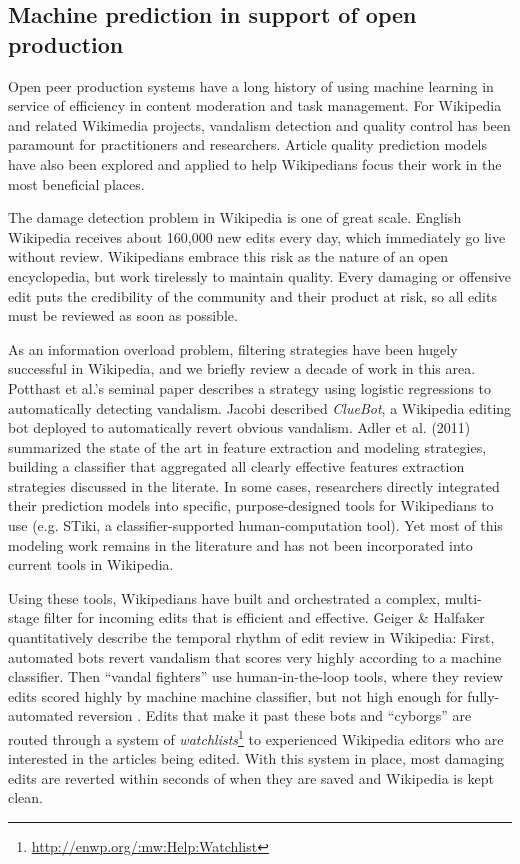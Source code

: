 \subsection{Machine prediction in support of open production}
Open peer production systems have a long history of using machine learning in service of efficiency in content moderation and task management. For Wikipedia and related Wikimedia projects, vandalism detection and quality control has been paramount for practitioners and researchers.  Article quality prediction models have also been explored and applied to help Wikipedians focus their work in the most beneficial places.

 The damage detection problem in Wikipedia is one of great scale.  English Wikipedia receives about 160,000 new edits every day, which immediately go live without review.  Wikipedians embrace this risk as the nature of an open encyclopedia, but work tirelessly to maintain quality. Every damaging or offensive edit puts the credibility of the community and their product at risk, so all edits must be reviewed as soon as possible.

As an information overload problem, filtering strategies have been hugely successful in Wikipedia, and we briefly review a decade of work in this area. Potthast et al.'s seminal paper\cite{potthast2008automatic} describes a strategy using logistic regressions to automatically detecting vandalism. Jacobi described \emph{ClueBot}\cite{carter2008cluebot}, a Wikipedia editing bot deployed to automatically revert obvious vandalism. Adler et al. (2011) summarized the state of the art in feature extraction and modeling strategies, building a classifier that aggregated all clearly effective features extraction strategies discussed in the literate\cite{adler2011wikipedia}.  In some cases, researchers directly integrated their prediction models into specific, purpose-designed tools for Wikipedians to use (e.g. STiki\cite{west2010stiki}, a classifier-supported human-computation tool). Yet most of this modeling work remains in the literature and has not been incorporated into current tools in Wikipedia.

Using these tools, Wikipedians have built and orchestrated a complex, multi-stage filter for incoming edits that is efficient and effective.  Geiger \& Halfaker quantitatively describe the temporal rhythm of edit review in Wikipedia\cite{geiger2013levee}: First, automated bots revert vandalism that scores very highly according to a machine classifier. Then ``vandal fighters'' use human-in-the-loop tools, where they review edits scored highly by machine machine classifier, but not high enough for fully-automated reversion \cite{geiger2010work}.  Edits that make it past these bots and ``cyborgs''\cite{halfaker2012bots} are routed through a system of \emph{watchlists}\footnote{\url{http://enwp.org/:mw:Help:Watchlist}} to experienced Wikipedia editors who are interested in the articles being edited.  With this system in place, most damaging edits are reverted within seconds of when they are saved\cite{geiger2013levee} and Wikipedia is kept clean.

